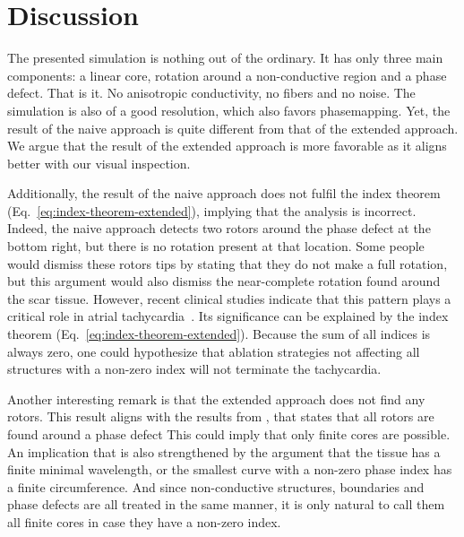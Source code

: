 \documentclass[twocolumn]{article}
\begin{document}
\section{Discussion}


The presented simulation is nothing out of the ordinary.
It has only three main components:
a linear core, rotation around a non-conductive region and a phase defect.
That is it. No anisotropic conductivity, no fibers and no noise.
The simulation is also of a good resolution, which also favors phasemapping.
Yet, the result of the naive approach is quite different
from that of the extended approach.
We argue that the result of the extended approach is more favorable
as it aligns better with our visual inspection.

Additionally, the result of the naive approach does not fulfil the index theorem (Eq.~\ref{eq:index-theorem-extended}),
implying that the analysis is incorrect.
Indeed, the naive approach detects two rotors around the phase defect at the bottom right,
but there is no rotation present at that location.
Some people would dismiss these rotors tips
by stating that they do not make a full rotation,
but this argument would also dismiss the near-complete rotation
found around the scar tissue.
However, recent clinical studies indicate
that this pattern plays a critical role in atrial tachycardia~\autocite{duytschaever2024atrial, santucci2024identification, takigawa2019a}.
Its significance can be explained by the index theorem (Eq.~\ref{eq:index-theorem-extended}).
Because the sum of all indices is always zero,
one could hypothesize that ablation strategies
not affecting all structures with a non-zero index will not terminate the tachycardia.

Another interesting remark is
that the extended approach does not find any rotors.
This result aligns with the results from \autocite{tomii2021spatial},
that states that all rotors are found around a phase defect
This could imply that only finite cores are possible.
An implication that is also strengthened by the argument that the
tissue has a finite minimal wavelength,
or the smallest curve with a non-zero phase index has a finite circumference.
And since non-conductive structures, boundaries
and phase defects are all treated in the same manner,
it is only natural to call them all finite cores in case they have a non-zero index.
\end{document}
